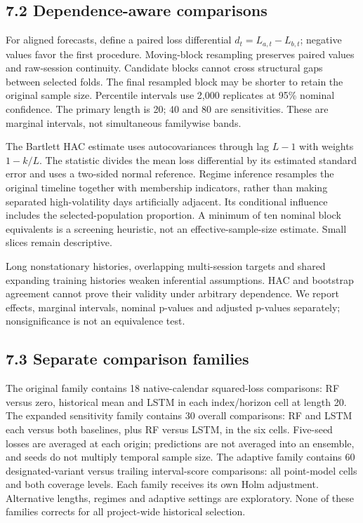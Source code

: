 \documentclass[11pt]{article}
\begin{document}
\subsection*{7.2 Dependence-aware comparisons}

For aligned forecasts, define a paired loss differential $d_t=L_{a,t}-L_{b,t}$; negative values favor the first procedure. Moving-block resampling preserves paired values and raw-session continuity. Candidate blocks cannot cross structural gaps between selected folds. The final resampled block may be shorter to retain the original sample size. Percentile intervals use 2,000 replicates at 95\% nominal confidence. The primary length is 20; 40 and 80 are sensitivities. These are marginal intervals, not simultaneous familywise bands.

The Bartlett HAC estimate uses autocovariances through lag $L-1$ with weights $1-k/L$. The statistic divides the mean loss differential by its estimated standard error and uses a two-sided normal reference. Regime inference resamples the original timeline together with membership indicators, rather than making separated high-volatility days artificially adjacent. Its conditional influence includes the selected-population proportion. A minimum of ten nominal block equivalents is a screening heuristic, not an effective-sample-size estimate. Small slices remain descriptive.

Long nonstationary histories, overlapping multi-session targets and shared expanding training histories weaken inferential assumptions. HAC and bootstrap agreement cannot prove their validity under arbitrary dependence. We report effects, marginal intervals, nominal p-values and adjusted p-values separately; nonsignificance is not an equivalence test.

\subsection*{7.3 Separate comparison families}

The original family contains 18 native-calendar squared-loss comparisons: RF versus zero, historical mean and LSTM in each index/horizon cell at length 20. The expanded sensitivity family contains 30 overall comparisons: RF and LSTM each versus both baselines, plus RF versus LSTM, in the six cells. Five-seed losses are averaged at each origin; predictions are not averaged into an ensemble, and seeds do not multiply temporal sample size. The adaptive family contains 60 designated-variant versus trailing interval-score comparisons: all point-model cells and both coverage levels. Each family receives its own Holm adjustment. Alternative lengths, regimes and adaptive settings are exploratory. None of these families corrects for all project-wide historical selection.
\end{document}

